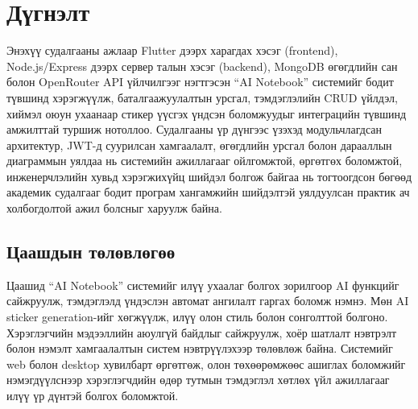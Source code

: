 \chapter{Дүгнэлт}
\label{sec:conclusion}

Энэхүү судалгааны ажлаар Flutter дээрх харагдах хэсэг (frontend), Node.js/Express дээрх сервер талын хэсэг (backend), MongoDB өгөгдлийн сан болон OpenRouter API үйлчилгээг нэгтгэсэн ``AI Notebook'' системийг бодит түвшинд хэрэгжүүлж, баталгаажуулалтын урсгал, тэмдэглэлийн CRUD үйлдэл, хиймэл оюун ухаанаар стикер үүсгэх үндсэн боломжуудыг интеграцийн түвшинд амжилттай туршиж нотоллоо. Судалгааны үр дүнгээс үзэхэд модульчлагдсан архитектур, JWT-д суурилсан хамгаалалт, өгөгдлийн урсгал болон дарааллын диаграммын уялдаа нь системийн ажиллагааг ойлгомжтой, өргөтгөх боломжтой, инженерчлэлийн хувьд хэрэгжихүйц шийдэл болгож байгаа нь тогтоогдсон бөгөөд академик судалгааг бодит програм хангамжийн шийдэлтэй уялдуулсан практик ач холбогдолтой ажил болсныг харуулж байна.

 \section{Цаашдын төлөвлөгөө}
Цаашид ``AI Notebook'' системийг илүү ухаалаг болгох зорилгоор AI функцийг сайжруулж, тэмдэглэлд үндэслэн автомат ангилалт гаргах боломж нэмнэ. Мөн AI sticker generation-ийг хөгжүүлж, илүү олон стиль болон сонголттой болгоно. Хэрэглэгчийн мэдээллийн аюулгүй байдлыг сайжруулж, хоёр шатлалт нэвтрэлт болон нэмэлт хамгаалалтын систем нэвтрүүлэхээр төлөвлөж байна. Системийг web болон desktop хувилбарт өргөтгөж, олон төхөөрөмжөөс ашиглах боломжийг нэмэгдүүлснээр хэрэглэгчдийн өдөр тутмын тэмдэглэл хөтлөх үйл ажиллагааг илүү үр дүнтэй болгох боломжтой.





